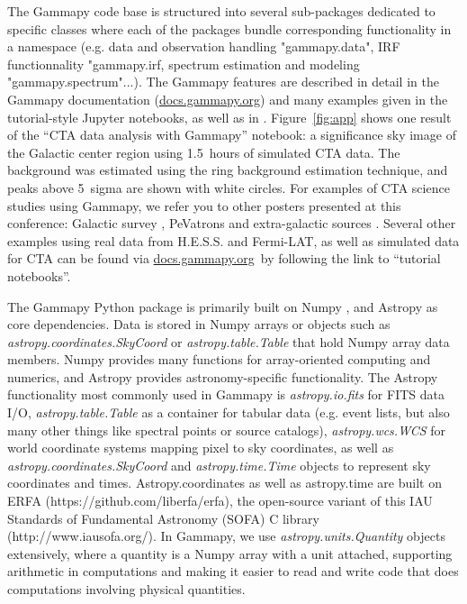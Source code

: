 \documentclass{PoS}
\newcommand{\urlGammapyDocs}{\href{http://docs.gammapy.org}{docs.gammapy.org}}
\begin{document}
The Gammapy code base is structured into several sub-packages dedicated to specific classes 
where each of the packages bundle corresponding functionality in a namespace 
(e.g. data and observation handling "gammapy.data", IRF functionnality "gammapy.irf, spectrum 
estimation and modeling "gammapy.spectrum"...).  The
Gammapy features are described in detail in the Gammapy documentation
(\urlGammapyDocs) and many examples given in the tutorial-style Jupyter
notebooks, as well as in \cite{gammapy-icrc2015}. Figure~\ref{fig:app} shows one result of the ``CTA data analysis with Gammapy''
notebook: a significance sky image of the Galactic center region using 1.5~hours
of simulated CTA data. The background was estimated using the ring background
estimation technique, and peaks above 5~sigma are shown with white circles. For examples of CTA science
studies using Gammapy, we refer you to other posters presented at this
conference: Galactic survey \cite{roberta}, PeVatrons \cite{cyril} and
extra-galactic sources \cite{julien}. Several other examples using real data
from H.E.S.S. and Fermi-LAT, as well as simulated data for CTA can be found via
\urlGammapyDocs\ by following the link to ``tutorial notebooks''.
 
The Gammapy Python package is primarily built on Numpy \cite{numpy}, and Astropy
\cite{astropy} as core dependencies. Data is stored in Numpy arrays or objects
such as {\it astropy.coordinates.SkyCoord} or {\it astropy.table.Table} that
hold Numpy array data members. Numpy provides many functions for array-oriented
computing and numerics, and Astropy provides astronomy-specific functionality.
The Astropy functionality most commonly used in Gammapy is {\it astropy.io.fits}
for FITS data I/O, {\it astropy.table.Table} as a container for tabular data
(e.g. event lists, but also many other things like spectral points or source
catalogs), {\it astropy.wcs.WCS} for world coordinate systems mapping pixel to
sky coordinates, as well as {\it astropy.coordinates.SkyCoord} and {\it
astropy.time.Time} objects to represent sky coordinates and times. Astropy.coordinates 
as well as astropy.time are built on ERFA (https://github.com/liberfa/erfa), the
open-source variant of this IAU Standards of Fundamental Astronomy (SOFA) 
C library (http://www.iausofa.org/). In Gammapy,
we use {\it astropy.units.Quantity} objects extensively, where a quantity is a
Numpy array with a unit attached, supporting arithmetic in computations and
making it easier to read and write code that does computations involving
physical quantities.
\end{document}
